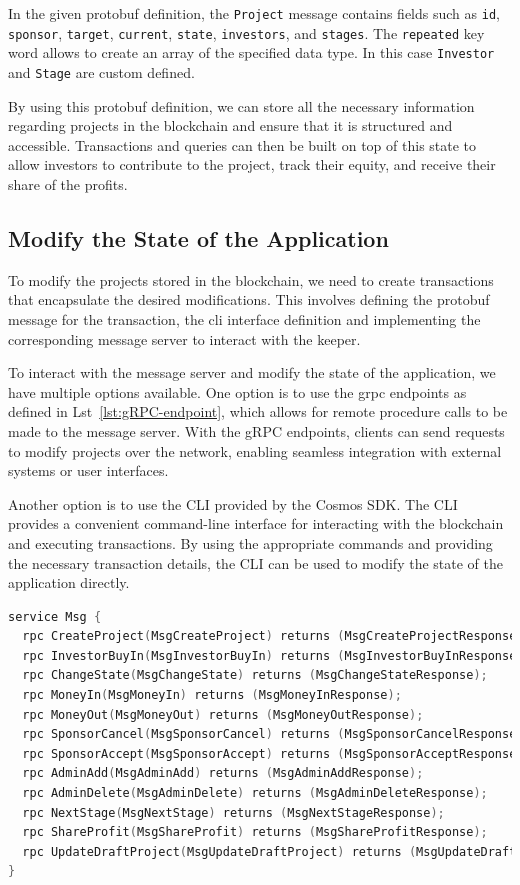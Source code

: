 In the given protobuf definition, the \texttt{Project} message contains fields such as \texttt{id}, \texttt{sponsor}, \texttt{target}, \texttt{current}, \texttt{state}, \texttt{investors}, and \texttt{stages}. The \texttt{repeated} key word allows to create an array of the specified data type. In this case \texttt{Investor} and \texttt{Stage} are custom defined.

By using this protobuf definition, we can store all the necessary information regarding projects in the blockchain and ensure that it is structured and accessible. Transactions and queries can then be built on top of this state to allow investors to contribute to the project, track their equity, and receive their share of the profits.

\subsection{Modify the State of the Application}

To modify the projects stored in the blockchain, we need to create transactions that encapsulate the desired modifications. This involves defining the protobuf message for the transaction, the \gls{cli} interface definition and implementing the corresponding message server to interact with the keeper.

To interact with the message server and modify the state of the application, we have multiple options available. One option is to use the \gls{grpc} endpoints as defined in Lst~\ref{lst:gRPC-endpoint}, which allows for remote procedure calls to be made to the message server. With the gRPC endpoints, clients can send requests to modify projects over the network, enabling seamless integration with external systems or user interfaces.

Another option is to use the CLI provided by the Cosmos SDK. The CLI provides a convenient command-line interface for interacting with the blockchain and executing transactions. By using the appropriate commands and providing the necessary transaction details, the CLI can be used to modify the state of the application directly.

\begin{lstlisting}[language=go, caption=gRPC endpoints definition,label={lst:gRPC-endpoint}]
service Msg {
  rpc CreateProject(MsgCreateProject) returns (MsgCreateProjectResponse);
  rpc InvestorBuyIn(MsgInvestorBuyIn) returns (MsgInvestorBuyInResponse);
  rpc ChangeState(MsgChangeState) returns (MsgChangeStateResponse);
  rpc MoneyIn(MsgMoneyIn) returns (MsgMoneyInResponse);
  rpc MoneyOut(MsgMoneyOut) returns (MsgMoneyOutResponse);
  rpc SponsorCancel(MsgSponsorCancel) returns (MsgSponsorCancelResponse);
  rpc SponsorAccept(MsgSponsorAccept) returns (MsgSponsorAcceptResponse);
  rpc AdminAdd(MsgAdminAdd) returns (MsgAdminAddResponse);
  rpc AdminDelete(MsgAdminDelete) returns (MsgAdminDeleteResponse);
  rpc NextStage(MsgNextStage) returns (MsgNextStageResponse);
  rpc ShareProfit(MsgShareProfit) returns (MsgShareProfitResponse);
  rpc UpdateDraftProject(MsgUpdateDraftProject) returns (MsgUpdateDraftProjectResponse);
}
\end{lstlisting}

